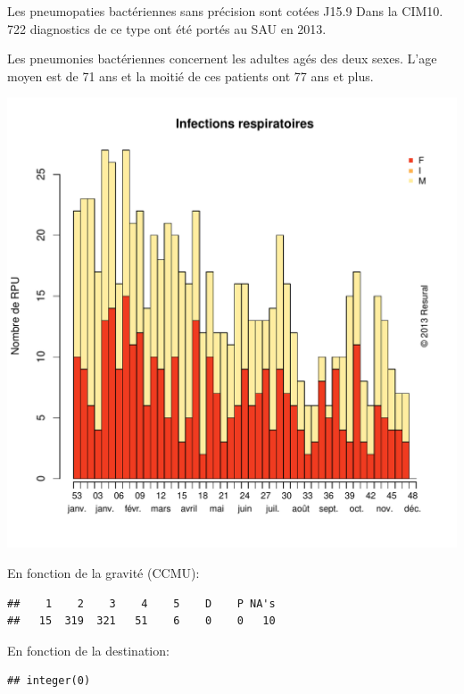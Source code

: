 \documentclass[12pt,english,french,twoside]{report}\usepackage[]{graphicx}\usepackage[]{color}
\makeatletter
\def\maxwidth{ %
  \ifdim\Gin@nat@width>\linewidth
    \linewidth
  \else
    \Gin@nat@width
  \fi
}
\newenvironment{kframe}{%
 \def\at@end@of@kframe{}%
 \ifinner\ifhmode%
  \def\at@end@of@kframe{\end{minipage}}%
  \begin{minipage}{\columnwidth}%
 \fi\fi%
 \def\FrameCommand##1{\hskip\@totalleftmargin \hskip-\fboxsep
 \colorbox{shadecolor}{##1}\hskip-\fboxsep
     \hskip-\linewidth \hskip-\@totalleftmargin \hskip\columnwidth}%
 \MakeFramed {\advance\hsize-\width
   \@totalleftmargin\z@ \linewidth\hsize
   \@setminipage}}%
 {\par\unskip\endMakeFramed%
 \at@end@of@kframe}
\newenvironment{knitrout}{}{} %
\makeatother
\begin{document}
Les pneumopaties bactériennes sans précision sont cotées J15.9 Dans la CIM10.
722 diagnostics de ce type ont été portés au SAU en 2013.

Les pneumonies bactériennes concernent les adultes agés des deux sexes. L'age moyen est de 71 ans et la moitié de ces patients ont 77 ans et plus.

\begin{knitrout}
\color{fgcolor}
\includegraphics[width=\maxwidth]{figure/pneumo} 

\end{knitrout}


En fonction de la gravité (CCMU):
\begin{knitrout}
\color{fgcolor}\begin{kframe}
\begin{verbatim}
##    1    2    3    4    5    D    P NA's 
##   15  319  321   51    6    0    0   10
\end{verbatim}
\end{kframe}
\end{knitrout}


En fonction de la destination:
\begin{knitrout}
\color{fgcolor}\begin{kframe}
\begin{verbatim}
## integer(0)
\end{verbatim}
\end{kframe}
\end{knitrout}
\end{document}
